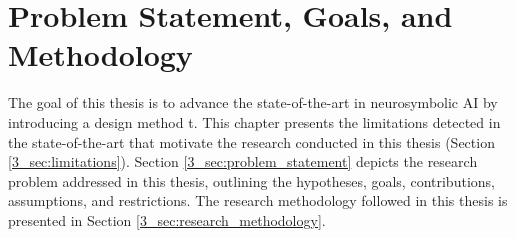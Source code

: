 \chapter{Problem Statement, Goals, and Methodology}\label{chap:methodology}

The goal of this thesis is to advance the state-of-the-art in neurosymbolic AI by introducing a design method t. This chapter presents the limitations detected in the state-of-the-art that motivate the research conducted in this thesis (Section \ref{3_sec:limitations}). Section \ref{3_sec:problem_statement} depicts the research problem addressed in this thesis, outlining the hypotheses, goals, contributions, assumptions, and restrictions. The research methodology followed in this thesis is presented in Section \ref{3_sec:research_methodology}.

